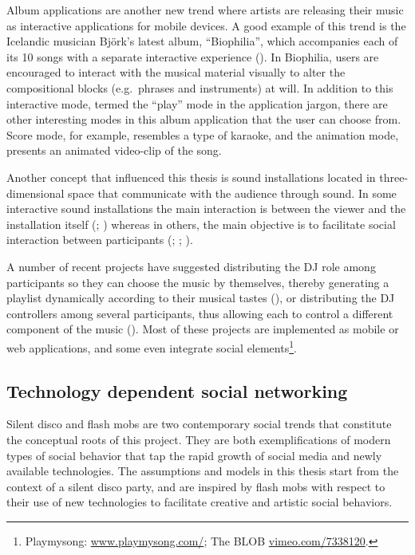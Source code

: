 \documentclass[a4paper,11pt]{article}
\begin{document}
Album applications are another new trend where artists are releasing their music as interactive applications for mobile devices.
A good example of this trend is the Icelandic musician Bj\"{o}rk's latest album, ``Biophilia'', which accompanies each of its 10 songs with a separate interactive experience (\cite{stimulant13}).
In Biophilia, users are encouraged to interact with the musical material visually to alter the compositional blocks (e.g.\ phrases and instruments) at will.
In addition to this interactive mode, termed the ``play'' mode in the application jargon, there are other interesting modes in this album application that the user can choose from.
Score mode, for example, resembles a type of karaoke, and the animation mode, presents an animated video-clip of the song.

Another concept that influenced this thesis is sound installations located in three-dimensional space that communicate with the audience through sound.
In some interactive sound installations the main interaction is between the viewer and the installation itself (\cite{web:visnjic}; \cite{web:cardiff01}) whereas in others, the main objective is to facilitate social interaction between participants (\cite{eng03}; \cite{web:kirn12}; \cite{web:murray-browne13}).

A number of recent projects have suggested distributing the DJ role among participants so they can choose the music by themselves, thereby generating a playlist dynamically according to their musical tastes (\cite{web:shaw}), or distributing the DJ controllers among several participants, thus allowing each to control a different component of the music (\cite{web:shapira}).
Most of these projects are implemented as mobile or web applications, and some even integrate social elements\footnote{Playmysong: \href{http://www.playmysong.com/}{www.playmysong.com/}; The BLOB \href{http://vimeo.com/7338120}{vimeo.com/7338120}.}.

\subsection{Technology dependent social networking} \label{literature:social_tech}

Silent disco and flash mobs are two contemporary social trends that constitute the conceptual roots of this project.
They are both exemplifications of modern types of social behavior that tap the rapid growth of social media and newly available technologies.
The assumptions and models in this thesis start from the context of a silent disco party, and are inspired by flash mobs with respect to their use of new technologies to facilitate creative and artistic social behaviors.
\end{document}
